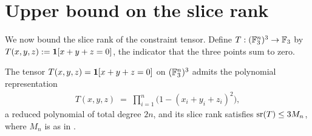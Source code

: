 \section{Upper bound on the slice rank}\label{sec:upper}

We now bound the slice rank of the constraint tensor. Define
$T:(\mathbb{F}_3^n)^3\to\mathbb{F}_3$ by $T(x,y,z):=\mathbf{1}[x+y+z=0]$, the indicator that the three
points sum to zero.

\begin{lemma}\label{lem:upper}
The tensor $T(x,y,z)=\mathbf{1}[x+y+z=0]$ on $(\mathbb{F}_3^n)^3$ admits the polynomial
representation
\begin{align}\label{eq:T-poly}
T(x,y,z)\;=\;\prod_{i=1}^{n}\bigl(1-(x_i+y_i+z_i)^2\bigr),
\end{align}
a reduced polynomial of total degree $2n$, and its slice rank satisfies
$\operatorname{sr}(T)\le 3M_n$, where $M_n$ is as in .
\end{lemma}

